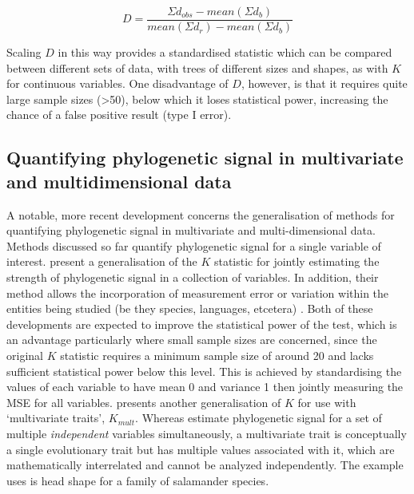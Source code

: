 \begin{equation}
D = \frac{\Sigma d_{obs} - mean\left( \Sigma d_{b} \right)}{mean\left( \Sigma d_{r} \right) - mean\left( \Sigma d_{b} \right)}
\end{equation}

Scaling \(D\) in this way provides a standardised statistic which can be compared between different sets of data, with trees of different sizes and shapes, as with \(K\) for continuous variables. One disadvantage of \(D\), however, is that it requires quite large sample sizes (\textgreater{}50), below which it loses statistical power, increasing the chance of a false positive result (type I error).

\hypertarget{phylo-sig-mult}{%
\subsection{Quantifying phylogenetic signal in multivariate and multidimensional data}\label{phylo-sig-mult}}

A notable, more recent development concerns the generalisation of methods for quantifying phylogenetic signal in multivariate and multi-dimensional data. Methods discussed so far quantify phylogenetic signal for a single variable of interest. \textcite{zheng_new_2009} present a generalisation of the \textcite{blomberg_testing_2003} \(K\) statistic for jointly estimating the strength of phylogenetic signal in a collection of variables. In addition, their method allows the incorporation of measurement error or variation within the entities being studied (be they species, languages, etcetera) \autocite[see][]{ives_within-species_2007}. Both of these developments are expected to improve the statistical power of the test, which is an advantage particularly where small sample sizes are concerned, since the original \(K\) statistic requires a minimum sample size of around 20 and lacks sufficient statistical power below this level. This is achieved by standardising the values of each variable to have mean 0 and variance 1 then jointly measuring the MSE for all variables. \textcite{adams_generalized_2014} presents another generalisation of \(K\) for use with `multivariate traits', \(K_{mult}\). Whereas \textcite{zheng_new_2009} estimate phylogenetic signal for a set of multiple \emph{independent} variables simultaneously, a multivariate trait is conceptually a single evolutionary trait but has multiple values associated with it, which are mathematically interrelated and cannot be analyzed independently. The example \textcite{adams_generalized_2014} uses is head shape for a family of salamander species.

